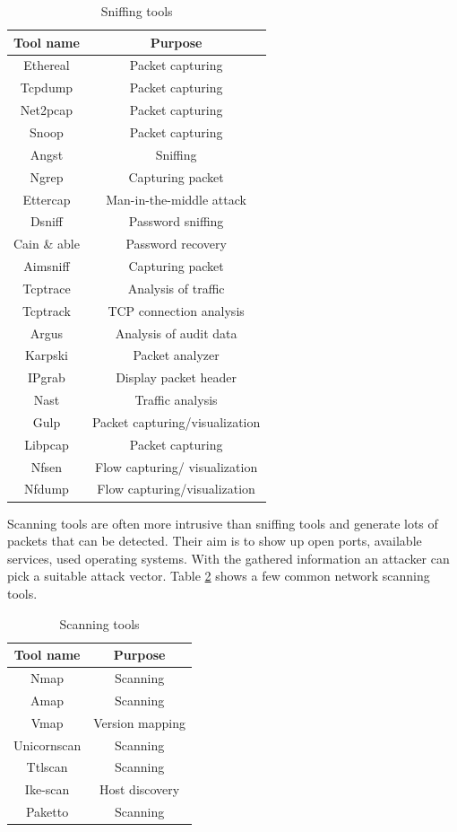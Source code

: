 \documentclass[conference]{IEEEtran}
\begin{document}
\begin{table}[htbp]
\caption{Sniffing tools \cite{b1}} 
\centering
\begin{tabular}{ | c | c | }
\hline
Tool name & Purpose \\
\hline
Ethereal & Packet capturing \\
Tcpdump & Packet capturing  \\
Net2pcap & Packet capturing  \\
Snoop & Packet capturing \\
Angst & Sniffing  \\
Ngrep & Capturing packet  \\
Ettercap & Man-in-the-middle attack  \\
Dsniff & Password sniffing  \\
Cain \& able & Password recovery  \\
Aimsniff & Capturing packet \\
Tcptrace & Analysis of traffic \\
Tcptrack & TCP connection analysis  \\
Argus & Analysis of audit data \\
Karpski & Packet analyzer \\
IPgrab & Display packet header \\
Nast & Traffic analysis \\
Gulp & Packet capturing/visualization \\
Libpcap & Packet capturing \\
Nfsen & Flow capturing/ visualization \\
Nfdump & Flow capturing/visualization \\
\hline
\end{tabular}
\label{table:sniffing-tools}
\end{table}

Scanning tools are often more intrusive than sniffing tools and generate lots of packets that can be detected. Their aim is to show up open ports, available services, used operating systems. With the gathered information an attacker can pick a suitable attack vector.
Table \ref{table:scanning-tools} shows a few common network scanning tools. 

\begin{table}[htbp]
\caption{Scanning tools \cite{b1}} 
\centering
\begin{tabular}{ | c | c | }
\hline
Tool name & Purpose \\
\hline
Nmap & Scanning	 \\
Amap & Scanning \\
Vmap & Version mapping \\
Unicornscan & Scanning \\
Ttlscan & Scanning \\
Ike-scan & Host discovery \\
Paketto & Scanning \\
\hline
\end{tabular}
\label{table:scanning-tools}
\end{table}
\end{document}
